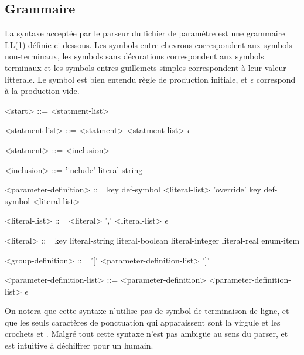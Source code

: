 \subsection{Grammaire}\label{sec:grammar}
La syntaxe accept\'ee par le parseur du fichier de param\`etre est une
grammaire LL(1) d\'efinie ci-dessous. Les symbols entre chevrons
correspondent aux symbols non-terminaux, les symbols sans
d\'ecorations correspondent aux symbols terminaux et les symbols
entres guillemets simples correspondent \`a leur valeur litterale. Le
symbol  est bien entendu r\`egle de production initiale,
et $\epsilon$ correspond \`a la production vide.
\begin{grammar}
  <start> ::= <statment-list>
  
  <statment-list> ::= <statment> <statment-list> \alt $\epsilon$
  
  <statment> ::= <inclusion>  
  
  <inclusion> ::= 'include' literal-string

  <parameter-definition> ::= key def-symbol <literal-list> \alt 'override' key def-symbol <literal-list>

  <literal-list> ::= <literal> ',' <literal-list> \alt $\epsilon$
  
  <literal> ::= key \alt literal-string \alt literal-boolean \alt literal-integer \alt literal-real \alt enum-item

  <group-definition> ::= '[' <parameter-definition-list> ']'

  <parameter-definition-list> ::= <parameter-definition> <parameter-definition-list> \alt $\epsilon$
\end{grammar}
On notera que cette syntaxe n'utilise pas de symbol de terminaison de
ligne, et que les seuls caract\`eres de ponctuation qui apparaissent
sont la virgule \lit{,} et les crochets \lit{[} et \lit{]}. Malgr\'e tout cette syntaxe
n'est pas ambig\"ue au sens du parser, et est intuitive \`a
d\'echiffrer pour un humain.

